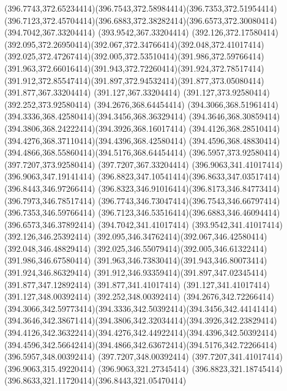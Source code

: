 {{	\curveto(396.7743,372.65234414)(396.7543,372.58984414)(396.7353,372.51954414)
	\curveto(396.7123,372.45704414)(396.6883,372.38282414)(396.6573,372.30080414)
	\lineto(394.7042,367.33204414)
	\lineto(393.9542,367.33204414)
	\lineto(392.126,372.17580414)
	\curveto(392.095,372.26950414)(392.067,372.34766414)(392.048,372.41017414)
	\curveto(392.025,372.47267414)(392.005,372.53510414)(391.986,372.59766414)
	\curveto(391.963,372.66016414)(391.943,372.72260414)(391.924,372.78517414)
	\curveto(391.912,372.85547414)(391.897,372.94532414)(391.877,373.05080414)
	\lineto(391.877,367.33204414)
	\lineto(391.127,367.33204414)
	\lineto(391.127,373.92580414)
	\lineto(392.252,373.92580414)
	\lineto(394.2676,368.64454414)
	\curveto(394.3066,368.51961414)(394.3336,368.42580414)(394.3456,368.36329414)
	\curveto(394.3646,368.30859414)(394.3806,368.24222414)(394.3926,368.16017414)
	\curveto(394.4126,368.28510414)(394.4276,368.37110414)(394.4396,368.42580414)
	\curveto(394.4596,368.48830414)(394.4866,368.55860414)(394.5176,368.64454414)
	\lineto(396.5957,373.92580414)
	\lineto(397.7207,373.92580414)
	\lineto(397.7207,367.33204414)
	\closepath
	\moveto(396.9063,341.41017414)
	\lineto(396.9063,347.19141414)
	\curveto(396.8823,347.10541414)(396.8633,347.03517414)(396.8443,346.97266414)
	\curveto(396.8323,346.91016414)(396.8173,346.84773414)(396.7973,346.78517414)
	\curveto(396.7743,346.73047414)(396.7543,346.66797414)(396.7353,346.59766414)
	\curveto(396.7123,346.53516414)(396.6883,346.46094414)(396.6573,346.37892414)
	\lineto(394.7042,341.41017414)
	\lineto(393.9542,341.41017414)
	\lineto(392.126,346.25392414)
	\curveto(392.095,346.34762414)(392.067,346.42580414)(392.048,346.48829414)
	\curveto(392.025,346.55079414)(392.005,346.61322414)(391.986,346.67580414)
	\curveto(391.963,346.73830414)(391.943,346.80073414)(391.924,346.86329414)
	\curveto(391.912,346.93359414)(391.897,347.02345414)(391.877,347.12892414)
	\lineto(391.877,341.41017414)
	\lineto(391.127,341.41017414)
	\lineto(391.127,348.00392414)
	\lineto(392.252,348.00392414)
	\lineto(394.2676,342.72266414)
	\curveto(394.3066,342.59773414)(394.3336,342.50392414)(394.3456,342.44141414)
	\curveto(394.3646,342.38671414)(394.3806,342.32034414)(394.3926,342.23829414)
	\curveto(394.4126,342.36322414)(394.4276,342.44922414)(394.4396,342.50392414)
	\curveto(394.4596,342.56642414)(394.4866,342.63672414)(394.5176,342.72266414)
	\lineto(396.5957,348.00392414)
	\lineto(397.7207,348.00392414)
	\lineto(397.7207,341.41017414)
	\closepath
	\moveto(396.9063,315.49220414)
	\lineto(396.9063,321.27345414)
	\curveto(396.8823,321.18745414)(396.8633,321.11720414)(396.8443,321.05470414)
}}
